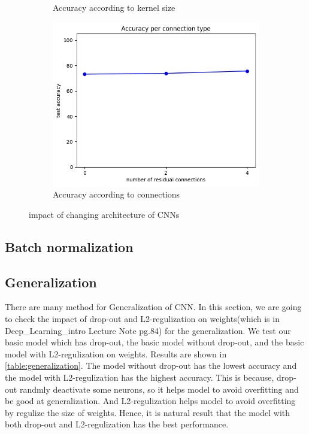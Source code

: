 \begin{figure}[htbp]
\begin{subfigure}[t]{0.3\linewidth}
		\caption{Accuracy according to kernel size}
		\label{fig:q4-2-kernel}
	\end{subfigure}%
    \hfill
	\begin{subfigure}[t]{0.3\linewidth}
		\centering
		\includegraphics[width=\linewidth]{image/q4-2-connection.png}
		\caption{Accuracy according to connections}
		\label{fig:q4-2-connection}
	\end{subfigure}

	\caption{impact of changing architecture of CNNs}
	\label{fig:cnn_architecture}
\end{figure}

\subsection{Batch normalization}

\subsection{Generalization}
There are many method for Generalization of CNN. In this section, we are going to check the impact of drop-out and L2-regulization on weights(which is in Deep_Learning_intro Lecture Note pg.84) for the generalization.
We test our basic model which has drop-out, the basic model without drop-out, and the basic model with L2-regulization on weights.
Results are shown in \cref{table:generalization}. The model without drop-out has the lowest accuracy and the model with L2-regulization has the highest accuracy. 
This is because, drop-out randmly deactivate some neurons, so it helps model to avoid overfitting and be good at generalization. And L2-regulization helps model to avoid overfitting by regulize the size of weights.
Hence, it is natural result that the model with both drop-out and L2-regulization has the best performance.

